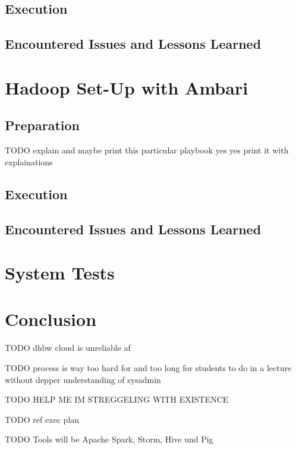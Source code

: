 \subsection{Execution}

\subsection{Encountered Issues and Lessons Learned}


\section{Hadoop Set-Up with Ambari}

\subsection{Preparation}

TODO explain and maybe print this particular playbook yes yes print it with explainations

\subsection{Execution}

\subsection{Encountered Issues and Lessons Learned}

\section{System Tests}

\section{Conclusion}

TODO dhbw cloud is unreliable af

TODO process is way too hard for and too long for students to do in a lecture without depper understanding of sysadmin  



TODO HELP ME IM STREGGELING WITH EXISTENCE



TODO ref exec plan

TODO Tools will be Apache Spark, Storm, Hive und Pig

